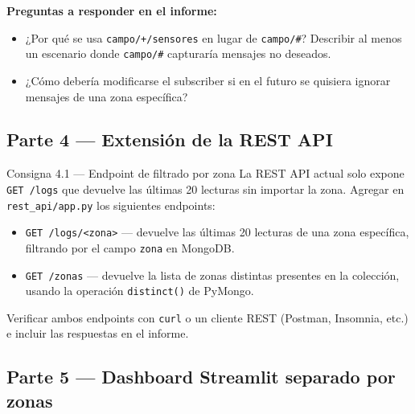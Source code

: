 \documentclass[12pt,a4paper]{article}
\begin{document}
\textbf{Preguntas a responder en el informe:}
\begin{itemize}
  \item ¿Por qué se usa \texttt{campo/+/sensores} en lugar de \texttt{campo/\#}?
        Describir al menos un escenario donde \texttt{campo/\#} capturaría
        mensajes no deseados.
  \item ¿Cómo debería modificarse el subscriber si en el futuro se quisiera
        ignorar mensajes de una zona específica?
\end{itemize}

\subsection{Parte 4 — Extensión de la REST API}

\begin{consigna}{Consigna 4.1 — Endpoint de filtrado por zona}
La REST API actual solo expone \texttt{GET /logs} que devuelve las últimas
20 lecturas sin importar la zona. Agregar en \texttt{rest\_api/app.py}
los siguientes endpoints:
\begin{itemize}
  \item \texttt{GET /logs/<zona>} — devuelve las últimas 20 lecturas de
        una zona específica, filtrando por el campo \texttt{zona} en MongoDB.
  \item \texttt{GET /zonas} — devuelve la lista de zonas distintas presentes
        en la colección, usando la operación \texttt{distinct()} de PyMongo.
\end{itemize}
Verificar ambos endpoints con \texttt{curl} o un cliente REST (Postman,
Insomnia, etc.) e incluir las respuestas en el informe.
\end{consigna}

\subsection{Parte 5 — Dashboard Streamlit separado por zonas}
\end{document}
